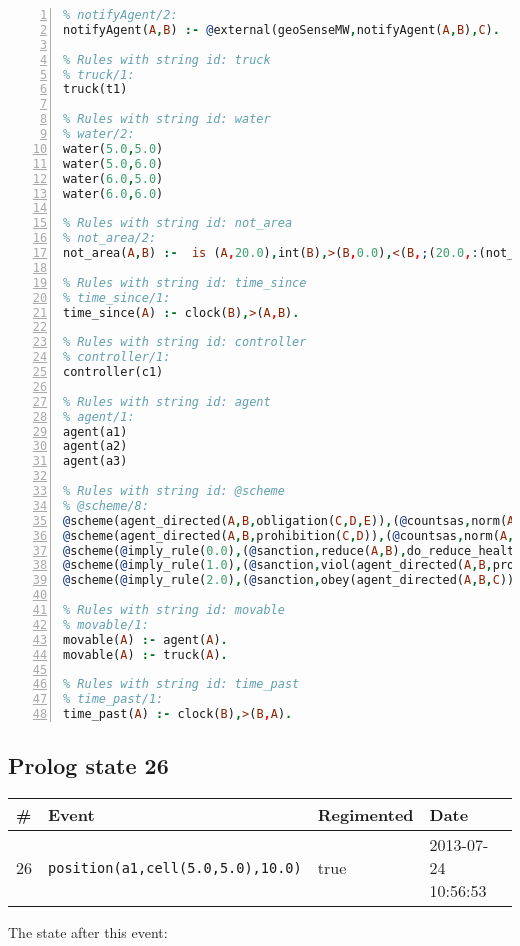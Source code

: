 \documentclass[11pt]{article}\usepackage[utf8]{inputenc}\usepackage{geometry}
\begin{document}
\begin{lstlisting}[language=Prolog, numbers=left]
% Rules with string id: notifyAgent
% notifyAgent/2:
notifyAgent(A,B) :- @external(geoSenseMW,notifyAgent(A,B),C).

% Rules with string id: truck
% truck/1:
truck(t1)

% Rules with string id: water
% water/2:
water(5.0,5.0)
water(5.0,6.0)
water(6.0,5.0)
water(6.0,6.0)

% Rules with string id: not_area
% not_area/2:
not_area(A,B) :-  is (A,20.0),int(B),>(B,0.0),<(B,;(20.0,:(not_area(A,B), is (-(B),20.0)))),int(A),>(A,0.0),<(A,;(20.0,:(area(A,B),-(int(A))))),int(B),>(A,0.0),>(B,0.0),<(A,21.0),<(B,21.0).

% Rules with string id: time_since
% time_since/1:
time_since(A) :- clock(B),>(A,B).

% Rules with string id: controller
% controller/1:
controller(c1)

% Rules with string id: agent
% agent/1:
agent(a1)
agent(a2)
agent(a3)

% Rules with string id: @scheme
% @scheme/8:
@scheme(agent_directed(A,B,obligation(C,D,E)),(@countsas,norm(A,B,F,obligation(C,D,E)),F),false,(listTrue(C)),(time_past(D)),false,[plus(viol(agent_directed(A,B,obligation(C,D,E))))|[]],[plus(obey(agent_directed(A,B,obligation(C,D,E))))|[]])
@scheme(agent_directed(A,B,prohibition(C,D)),(@countsas,norm(A,B,E,prohibition(C,D)),E),(listTrue(C)),false,(false),false,[plus(viol(agent_directed(A,B,prohibition(C,D))))|[]],[plus(obey(agent_directed(A,B,prohibition(C,D))))|[]])
@scheme(@imply_rule(0.0),(@sanction,reduce(A,B),do_reduce_health(A,B),notifyAgent(A,changed(status))),true,false,false,false,[min(reduce(A,B))|[]],[])
@scheme(@imply_rule(1.0),(@sanction,viol(agent_directed(A,B,prohibition(C,D))),do_sanction(D)),true,false,false,false,[min(viol(agent_directed(A,B,prohibition(C,D))))|[]],[])
@scheme(@imply_rule(2.0),(@sanction,obey(agent_directed(A,B,C))),true,false,false,false,[min(obey(agent_directed(A,B,C)))|[]],[])

% Rules with string id: movable
% movable/1:
movable(A) :- agent(A).
movable(A) :- truck(A).

% Rules with string id: time_past
% time_past/1:
time_past(A) :- clock(B),>(B,A).

\end{lstlisting}
\clearpage 
\subsection{Prolog state 26}
\begin{table}[ht]
\centering 
\begin{tabular}{l l l l} 
\textbf{\#} & \textbf{Event} & \textbf{Regimented} & \textbf{Date} \\ [0.5ex] 
\hline
26&\texttt{position(a1,cell(5.0,5.0),10.0)}&true&2013-07-24 10:56:53\\ [1ex] \hline\end{tabular}
\end{table}
The state after this event:
\end{document}
